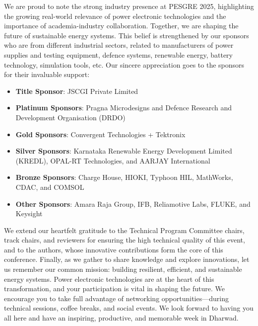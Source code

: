 We are proud to note the strong industry presence at PESGRE 2025, highlighting the growing real-world relevance of power electronic technologies and the importance of academia-industry collaboration. Together, we are shaping the future of sustainable energy systems. This belief is strengthened by our sponsors who are from different industrial sectors, related to manufacturers of power supplies and testing equipment, defence systems, renewable energy, battery technology, simulation tools, etc. 
Our sincere appreciation goes to the sponsors for their invaluable support:
\begin{itemize}
\setlength{\itemsep}{0pt}        %
\setlength{\parskip}{0pt}        %
\setlength{\parsep}{0pt}         %
	\item \textbf{Title Sponsor}: JSCGI Private Limited
	\item \textbf{Platinum Sponsors}: Pragna Microdesigns and Defence Research and Development Organisation (DRDO)
	\item \textbf{Gold Sponsors}: Convergent Technologies + Tektronix
	\item \textbf{Silver Sponsors}: Karnataka Renewable Energy Development Limited (KREDL), OPAL-RT Technologies, and AARJAY International
	\item \textbf{Bronze Sponsors}: Charge House, HIOKI, Typhoon HIL, MathWorks, CDAC, and COMSOL
	\item \textbf{Other Sponsors}: Amara Raja Group, IFB, Reliamotive Labs, FLUKE, and Keysight
\end{itemize}



We extend our heartfelt gratitude to the Technical Program Committee chairs, track chairs, and reviewers for ensuring the high technical quality of this event, and to the authors, whose innovative contributions form the core of this conference.
Finally, as we gather to share knowledge and explore innovations, let us remember our common mission: building resilient, efficient, and sustainable energy systems. Power electronic technologies are at the heart of this transformation, and your participation is vital in shaping the future.
We encourage you to take full advantage of networking opportunities—during technical sessions, coffee breaks, and social events. 
We look forward to having you all here and have an inspiring, productive, and memorable week in Dharwad.

